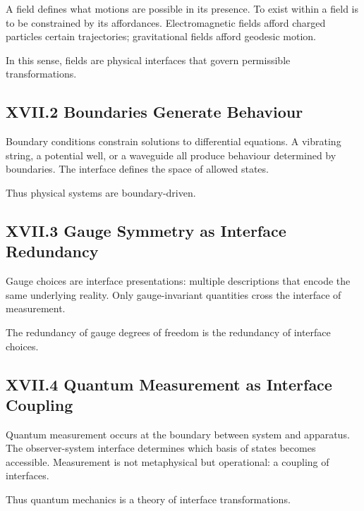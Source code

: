\documentclass[12pt,letterpaper]{article}
\begin{document}
A field defines what motions are possible in its presence. To exist within a field is to be constrained by its affordances. Electromagnetic fields afford charged particles certain trajectories; gravitational fields afford geodesic motion.

In this sense, fields are physical interfaces that govern permissible transformations.

\subsection{XVII.2 Boundaries Generate Behaviour}

Boundary conditions constrain solutions to differential equations. A vibrating string, a potential well, or a waveguide all produce behaviour determined by boundaries. The interface defines the space of allowed states.

Thus physical systems are boundary-driven.

\subsection{XVII.3 Gauge Symmetry as Interface Redundancy}

Gauge choices are interface presentations: multiple descriptions that encode the same underlying reality. Only gauge-invariant quantities cross the interface of measurement.

The redundancy of gauge degrees of freedom is the redundancy of interface choices.

\subsection{XVII.4 Quantum Measurement as Interface Coupling}

Quantum measurement occurs at the boundary between system and apparatus. The observer-system interface determines which basis of states becomes accessible. Measurement is not metaphysical but operational: a coupling of interfaces.

Thus quantum mechanics is a theory of interface transformations.
\end{document}
